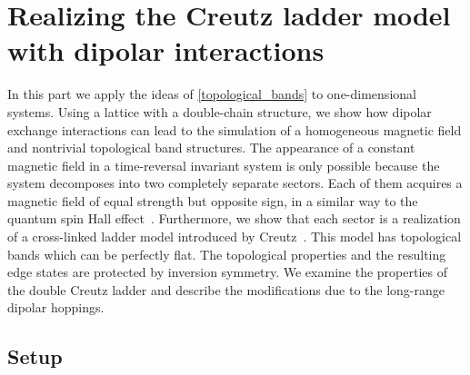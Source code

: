 \chapter[Realizing the Creutz ladder model with dipolar interactions]{Realizing the Creutz ladder model\texorpdfstring{\\}{ }with dipolar interactions}
\label{creutz_ladder}

In this part we apply the ideas of \cref{topological_bands} to one-dimensional systems.
Using a lattice with a double-chain structure, we show how dipolar exchange interactions can lead to the simulation of a homogeneous magnetic field and nontrivial topological band structures.
The appearance of a constant magnetic field in a time-reversal invariant system is only possible because the system decomposes into two completely separate sectors.
Each of them acquires a magnetic field of equal strength but opposite sign, in a similar way to the quantum spin Hall effect~\cite{Kane2005a}.
Furthermore, we show that each sector is a realization of a cross-linked ladder model introduced by Creutz~\cite{Creutz1999,Bermudez2009,Tovmasyan2013a,Takayoshi2013,Sticlet2014}.
This model has topological bands which can be perfectly flat. The topological properties and the resulting edge states are protected by inversion symmetry.
We examine the properties of the double Creutz ladder and describe the modifications due to the long-range dipolar hoppings.

\section{Setup}


